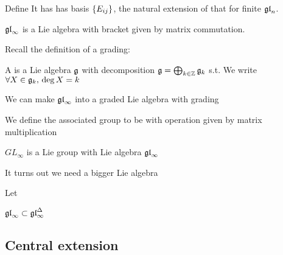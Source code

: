 \documentclass{article}
\begin{document}
\begin{definition}
Define
It has has basis $\left\{ E_{ij} \right\}$, the natural extension of that for finite $\mathfrak{gl}_n$. 
\end{definition}

\begin{prop}
$\mathfrak{gl}_\infty$ is a Lie algebra with bracket given by matrix commutation. 
\end{prop}

Recall the definition of a grading:

\begin{definition}
A  is a Lie algebra $\mathfrak{g}$ with decomposition $\mathfrak{g} = \bigoplus_{k \in \mathbb{Z}} \mathfrak{g}_k$ s.t. 
We write $\forall X \in \mathfrak{g}_k, \, \deg X = k$
\end{definition}

\begin{prop}
We can make $\mathfrak{gl}_\infty$ into a graded Lie algebra with grading 
\end{prop}

\begin{definition}
We define the associated group to be 
with operation given by matrix multiplication
\end{definition}

\begin{prop}
$GL_\infty$ is a Lie group with Lie algebra $\mathfrak{gl}_\infty$
\end{prop}

It turns out we need a bigger Lie algebra

\begin{definition}
Let 
\end{definition}

\begin{prop}
$\mathfrak{gl}_\infty \subset \mathfrak{gl}_\infty^\Delta$
\end{prop}

\subsection{Central extension}
\end{document}
